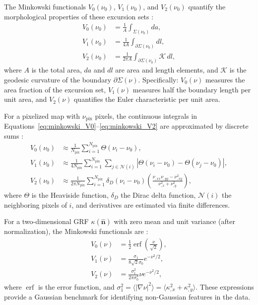 The Minkowski functionals $V_0(\nu_0)$, $V_1(\nu_0)$, and $V_2(\nu_0)$ quantify the morphological properties of these excursion sets \citep{2010PhRvD..81h3505M}: 
\begin{align}
    V_0(\nu_0) &= \frac{1}{A} \int_{\Sigma(\nu_0)} da, \label{eq:minkowski_V0} \\
    V_1(\nu_0) &= \frac{1}{4A} \int_{\partial \Sigma(\nu_0)} dl, \label{eq:minkowski_V1} \\
    V_2(\nu_0) &= \frac{1}{2\pi A} \int_{\partial \Sigma(\nu_0)} \mathcal{K} \, dl, \label{eq:minkowski_V2}
\end{align}
where $A$ is the total area, $da$ and $dl$ are area and length elements, and $\mathcal{K}$ is the geodesic curvature of the boundary $\partial \Sigma(\nu)$. Specifically: $V_0(\nu)$ measures the area fraction of the excursion set, $V_1(\nu)$ measures half the boundary length per unit area, and $V_2(\nu)$ quantifies the Euler characteristic per unit area.

For a pixelized map with $\nu_{\mathrm{pix}}$ pixels, the continuous integrals in Equations~\eqref{eq:minkowski_V0}--\eqref{eq:minkowski_V2} are approximated by discrete sums \citep{2012PhRvD..85j3513K}:
\begin{align}
    V_0(\nu_0) &\approx \frac{1}{N_{\mathrm{pix}}} \sum_{i=1}^{N_{\mathrm{pix}}} \Theta(\nu_i - \nu_0), \label{eq:V0_discrete} \\
    V_1(\nu_0) &\approx \frac{1}{4N_{\mathrm{pix}}} \sum_{i=1}^{N_{\mathrm{pix}}} \sum_{j \in \mathcal{N}(i)} |\Theta(\nu_i - \nu_0) - \Theta(\nu_j - \nu_0)|, \label{eq:V1_discrete} \\
    V_2(\nu_0) &\approx \frac{1}{2\pi N_{\mathrm{pix}}} \sum_{i=1}^{N_{\mathrm{pix}}} \delta_D(\nu_i - \nu_0) \left( \frac{\nu_{,xx} \nu_{,yy} - \nu_{,xy}^2}{\nu_{,x}^2 + \nu_{,y}^2} \right), \label{eq:V2_discrete}
\end{align}
where $\Theta$ is the Heaviside function, $\delta_D$ the Dirac delta function, $\mathcal{N}(i)$ the neighboring pixels of $i$, and derivatives are estimated via finite differences.

For a two-dimensional GRF $\kappa(\hat{\mathbf{n}})$ with zero mean and unit variance (after normalization), the Minkowski functionals are \citep{2010PhRvD..81h3505M}: 
\begin{align}
    V_0(\nu) &= \frac{1}{2} \operatorname{erf}\left( \frac{\nu}{\sqrt{2}} \right), \label{eq:V0_GRF} \\
    V_1(\nu) &= \frac{\sigma_1}{8\sqrt{2}\sigma_0} e^{-\nu^2/2}, \label{eq:V1_GRF} \\
    V_2(\nu) &= \frac{\sigma_1^2}{2\pi \sigma_0^3} \nu e^{-\nu^2/2}, \label{eq:V2_GRF}
\end{align}
where $\operatorname{erf}$ is the error function, and $\sigma_1^2 = \langle |\nabla \nu|^2 \rangle = \langle \kappa_{,x}^2 + \kappa_{,y}^2 \rangle$. These expressions provide a Gaussian benchmark for identifying non-Gaussian features in the data.